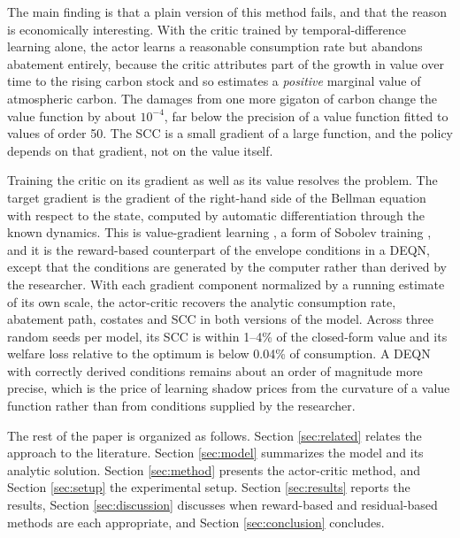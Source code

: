 The main finding is that a plain version of this method fails, and that the reason is economically interesting. With the critic trained by temporal-difference learning alone, the actor learns a reasonable consumption rate but abandons abatement entirely, because the critic attributes part of the growth in value over time to the rising carbon stock and so estimates a \emph{positive} marginal value of atmospheric carbon. The damages from one more gigaton of carbon change the value function by about \(10^{-4}\), far below the precision of a value function fitted to values of order 50. The SCC is a small gradient of a large function, and the policy depends on that gradient, not on the value itself.

Training the critic on its gradient as well as its value resolves the problem. The target gradient is the gradient of the right-hand side of the Bellman equation with respect to the state, computed by automatic differentiation through the known dynamics. This is value-gradient learning \parencite{Werbos1992ADP, Fairbank2012VGL}, a form of Sobolev training \parencite{Czarnecki2017Sobolev}, and it is the reward-based counterpart of the envelope conditions in a DEQN, except that the conditions are generated by the computer rather than derived by the researcher. With each gradient component normalized by a running estimate of its own scale, the actor-critic recovers the analytic consumption rate, abatement path, costates and SCC in both versions of the model. Across three random seeds per model, its SCC is within 1--4\% of the closed-form value and its welfare loss relative to the optimum is below 0.04\% of consumption. A DEQN with correctly derived conditions remains about an order of magnitude more precise, which is the price of learning shadow prices from the curvature of a value function rather than from conditions supplied by the researcher.

The rest of the paper is organized as follows. Section \ref{sec:related} relates the approach to the literature. Section \ref{sec:model} summarizes the model and its analytic solution. Section \ref{sec:method} presents the actor-critic method, and Section \ref{sec:setup} the experimental setup. Section \ref{sec:results} reports the results, Section \ref{sec:discussion} discusses when reward-based and residual-based methods are each appropriate, and Section \ref{sec:conclusion} concludes.
